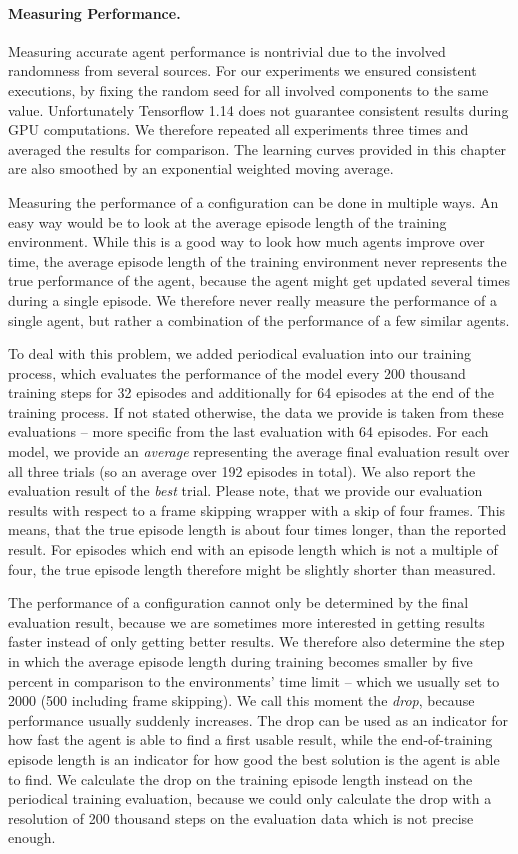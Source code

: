\paragraph{Measuring Performance.}
Measuring accurate agent performance is nontrivial due to the involved randomness from several sources. For our experiments we ensured consistent executions, by fixing the random seed for all involved components to the same value. Unfortunately Tensorflow 1.14 does not guarantee consistent results during GPU computations. We therefore repeated all experiments three times and averaged the results for comparison. The learning curves provided in this chapter are also smoothed by an exponential weighted moving average.

Measuring the performance of a configuration can be done in multiple ways. An easy way would be to look at the average episode length of the training environment. While this is a good way to look how much agents improve over time, the average episode length of the training environment never represents the true performance of the agent, because the agent might get updated several times during a single episode. We therefore never really measure the performance of a single agent, but rather a combination of the performance of a few similar agents. 

To deal with this problem, we added periodical evaluation into our training process, which evaluates the performance of the model every 200 thousand training steps for 32 episodes and additionally for 64 episodes at the end of the training process. If not stated otherwise, the data we provide is taken from these evaluations -- more specific from the last evaluation with 64 episodes. For each model, we provide an \textit{average} representing the average final evaluation result over all three trials (so an average over 192 episodes in total). We also report the evaluation result of the \textit{best} trial. Please note, that we provide our evaluation results with respect to a frame skipping wrapper with a skip of four frames. This means, that the true episode length is about four times longer, than the reported result. For episodes which end with an episode length which is not a multiple of four, the true episode length therefore might be slightly shorter than measured.

The performance of a configuration cannot only be determined by the final evaluation result, because we are sometimes more interested in getting results faster instead of only getting better results. We therefore also determine the step in which the average episode length during training becomes smaller by five percent in comparison to the environments' time limit -- which we usually set to 2000 (500 including frame skipping). We call this moment the \textit{drop}, because performance usually suddenly increases. The drop can be used as an indicator for how fast the agent is able to find a first usable result, while the end-of-training episode length is an indicator for how good the best solution is the agent is able to find. We calculate the drop on the training episode length instead on the periodical training evaluation, because we could only calculate the drop with a resolution of 200 thousand steps on the evaluation data which is not precise enough.

